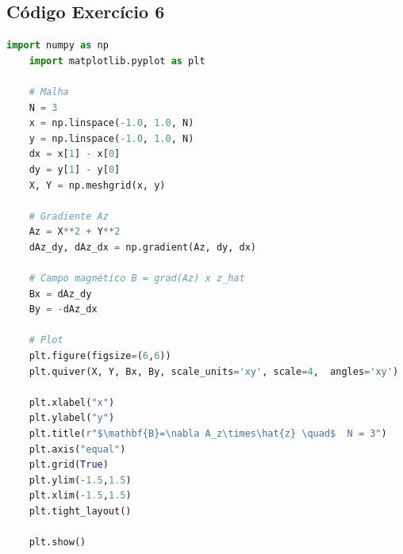 \begin{anexosenv}
    \chapter{Código Exercício 6}\label{cap:ex6-codigo}
    
    \begin{lstlisting}[language=Python, breaklines=true, basicstyle=\tiny]
    import numpy as np
    import matplotlib.pyplot as plt

    # Malha
    N = 3
    x = np.linspace(-1.0, 1.0, N)
    y = np.linspace(-1.0, 1.0, N)
    dx = x[1] - x[0]
    dy = y[1] - y[0]
    X, Y = np.meshgrid(x, y)

    # Gradiente Az
    Az = X**2 + Y**2
    dAz_dy, dAz_dx = np.gradient(Az, dy, dx)

    # Campo magnético B = grad(Az) x z_hat
    Bx = dAz_dy
    By = -dAz_dx

    # Plot
    plt.figure(figsize=(6,6))
    plt.quiver(X, Y, Bx, By, scale_units='xy', scale=4,  angles='xy')

    plt.xlabel("x")
    plt.ylabel("y")
    plt.title(r"$\mathbf{B}=\nabla A_z\times\hat{z} \quad$  N = 3")
    plt.axis("equal")
    plt.grid(True)
    plt.ylim(-1.5,1.5)
    plt.xlim(-1.5,1.5)
    plt.tight_layout()

    plt.show()
    \end{lstlisting}

\end{anexosenv}
